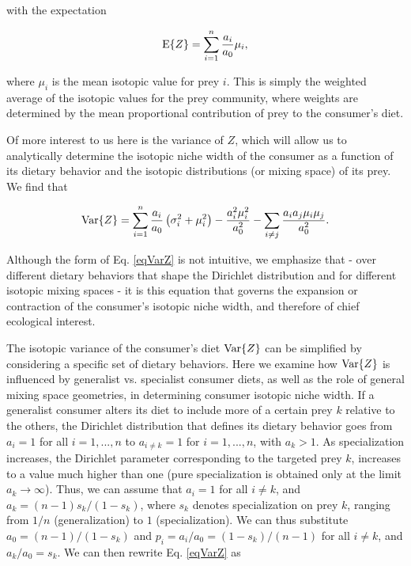 \documentclass{frontiersSCNS}
\begin{document}
\noindent with the expectation

\begin{equation}
\label{eqEZ}
  {\rm E}\{Z\} = \sum_{i=1}^n \frac{a_i}{a_0} \mu_i,
\end{equation}

\noindent where $\mu_i$ is the mean isotopic value for prey $i$.
This is simply the weighted average of the isotopic values for the prey community, where weights are determined by the mean proportional contribution of prey to the consumer's diet.

Of more interest to us here is the variance of $Z$, which will allow us to analytically determine the isotopic niche width of the consumer as a function of its dietary behavior and the isotopic distributions (or mixing space) of its prey.
We find that

\begin{equation}
\label{eqVarZ}
  {\rm Var}\{Z\} = \sum_{i=1}^n \frac{a_i}{a_0}\left(\sigma_i^2 + \mu_i^2\right) - \frac{a_i^2\mu_i^2}{a_0^2}-\sum_{i \neq j}\frac{a_i a_j \mu_i \mu_j}{a_0^2}.
\end{equation}

\noindent Although the form of Eq. \ref{eqVarZ} is not intuitive, we emphasize that - over different dietary behaviors that shape the Dirichlet distribution and for different isotopic mixing spaces - it is this equation that governs the expansion or contraction of the consumer's isotopic niche width, and therefore of chief ecological interest.

The isotopic variance of the consumer's diet ${\rm Var}\{Z\}$ can be simplified by considering a specific set of dietary behaviors.
Here we examine how ${\rm Var}\{Z\}$ is influenced by generalist vs. specialist consumer diets, as well as the role of general mixing space geometries, in determining consumer isotopic niche width.
If a generalist consumer alters its diet to include more of a certain prey $k$ relative to the others, the Dirichlet distribution that defines its dietary behavior goes from $a_i=1$ for all $i=1,...,n$ to $a_{i \neq k}=1$ for $i=1,...,n$, with $a_k>1$.
As specialization increases, the Dirichlet parameter corresponding to the targeted prey $k$, increases to a value much higher than one (pure specialization is obtained only at the limit $a_k \to \infty$).
Thus, we can assume that $a_i=1$ for all $i \neq k$, and $a_k = (n-1)s_k/(1-s_k)$, where $s_k$ denotes specialization on prey $k$, ranging from $1/n$ (generalization) to $1$ (specialization).
We can thus substitute $a_0 = (n-1)/(1-s_k)$ and $p_i = a_i/a_0 = (1-s_k)/(n-1)$ for all $i \neq k$, and $a_k/a_0 = s_k$.
We can then rewrite Eq. \ref{eqVarZ} as
\end{document}
